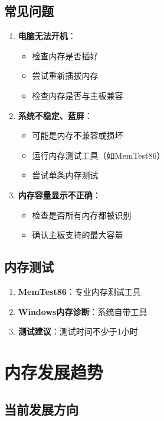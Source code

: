 \documentclass[12pt,UTF8]{ctexbook}
\begin{document}
\section{常见问题}

\begin{enumerate}
    \item \textbf{电脑无法开机}：
    \begin{itemize}[leftmargin=2em]
        \item 检查内存是否插好
        \item 尝试重新插拔内存
        \item 检查内存是否与主板兼容
    \end{itemize}
    
    \item \textbf{系统不稳定、蓝屏}：
    \begin{itemize}[leftmargin=2em]
        \item 可能是内存不兼容或损坏
        \item 运行内存测试工具（如MemTest86）
        \item 尝试单条内存测试
    \end{itemize}
    
    \item \textbf{内存容量显示不正确}：
    \begin{itemize}[leftmargin=2em]
        \item 检查是否所有内存都被识别
        \item 确认主板支持的最大容量
    \end{itemize}
\end{enumerate}

\section{内存测试}

\begin{enumerate}
    \item \textbf{MemTest86}：专业内存测试工具
    \item \textbf{Windows内存诊断}：系统自带工具
    \item \textbf{测试建议}：测试时间不少于1小时
\end{enumerate}

\chapter{内存发展趋势}

\section{当前发展方向}
\end{document}
